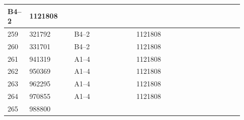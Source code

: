 \documentclass[UTF8,10pt,a4paper,fontset=fandol]{ctexart}
\newcommand{\fieldvalue}[1]{#1}
\begin{document}
\begin{center}
\begin{tabular}{|p{0.07\linewidth}|p{0.18\linewidth}|p{0.25\linewidth}|p{0.25\linewidth}|p{0.18\linewidth}|}
\fieldvalue{B4--2} &
\fieldvalue{1121808} & \\ \hline
\fieldvalue{259} &
\fieldvalue{321792} &
\fieldvalue{B4--2} &
\fieldvalue{1121808} & \\ \hline
\fieldvalue{260} &
\fieldvalue{331701} &
\fieldvalue{B4--2} &
\fieldvalue{1121808} & \\ \hline
\fieldvalue{261} &
\fieldvalue{941319} &
\fieldvalue{A1--4} &
\fieldvalue{1121808} & \\ \hline
\fieldvalue{262} &
\fieldvalue{950369} &
\fieldvalue{A1--4} &
\fieldvalue{1121808} & \\ \hline
\fieldvalue{263} &
\fieldvalue{962295} &
\fieldvalue{A1--4} &
\fieldvalue{1121808} & \\ \hline
\fieldvalue{264} &
\fieldvalue{970855} &
\fieldvalue{A1--4} &
\fieldvalue{1121808} & \\ \hline
\fieldvalue{265} &
\fieldvalue{988800} &

\end{tabular}
\end{center}
\end{document}
